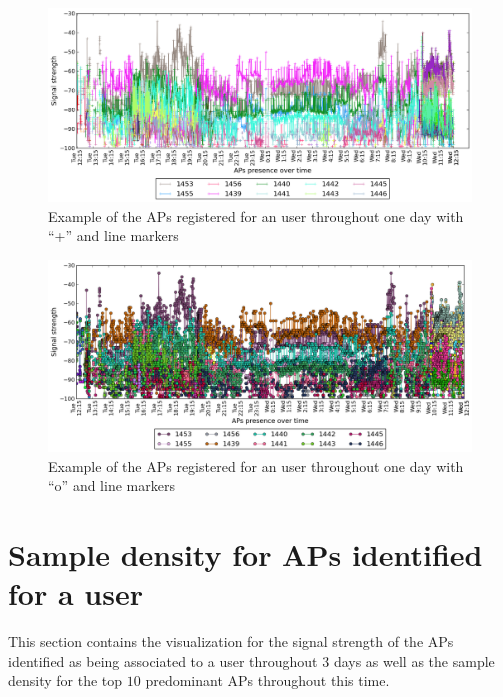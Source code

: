 \begin{figure}[h]
\centering
\includegraphics[height =
0.45\textwidth]{figures/cros_line_user_6_sorted_1days_plot.png}
\caption{Example of the APs registered for an user throughout one day with
``+'' and line markers}
\label{user_6_cross_line_1d}
\end{figure}

\begin{figure}[h]
\centering
\includegraphics[height =
0.45\textwidth]{figures/o_line_user_6_sorted_1days_plot.png}
\caption{Example of the APs registered for an user throughout one day with
``o'' and line markers}
\label{user_6_o_line_1d}
\end{figure}

\section{Sample density for APs identified for a user}
\label{appendix_sample_density}

This section contains the visualization for the signal strength of the APs
identified as being associated to a user throughout $3$ days as well as the
sample density for the top $10$ predominant APs throughout this time.

